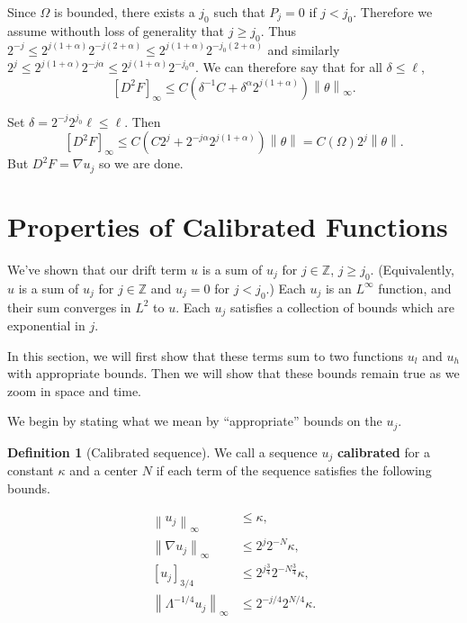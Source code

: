 \documentclass[11pt]{amsart}
\theoremstyle{remark}
\theoremstyle{definition}
\newtheorem{definition}{Definition}
\newcommand{\Z}{\mathbb{Z}}
\newcommand{\norm}[1]{\left\lVert#1\right\rVert}
\newcommand{\paren}[1]{\left( #1 \right)}
\newcommand{\bracket}[1]{\left[ #1 \right]}
\newcommand{\grad}{\nabla}
\newcommand{\n}{^{-1}}
\newcommand{\ulow}{u_l}
\newcommand{\uhigh}{u_h}
\begin{document}
Since $\Omega$ is bounded, there exists a $j_0$ such that $P_j = 0$ if $j < j_0$.  Therefore we assume withouth loss of generality that $j \geq j_0$.  Thus $2^{-j} \leq 2^{j(1+\alpha)} 2^{-j(2+\alpha)} \leq 2^{j(1+\alpha)} 2^{-j_0(2+\alpha)}$ and similarly $2^j \leq 2^{j(1+\alpha)}2^{-j\alpha} \leq 2^{j(1+\alpha)} 2^{-j_0\alpha}$.  We can therefore say that for all $\delta \leq \ell$,
\[ \bracket{D^2 F}_\infty \leq C \paren{\delta\n C + \delta^\alpha 2^{j(1+\alpha)}} \norm{\theta}_\infty. \]

Set $\delta = 2^{-j} 2^{j_0} \ell \leq \ell$.  Then
\[ \bracket{D^2 F}_\infty \leq C \paren{C 2^j + 2^{-j\alpha} 2^{j(1+\alpha)}} \norm{\theta} = C(\Omega) 2^j \norm{\theta}. \]
But $D^2 F = \grad u_j$ so we are done.  



\section{Properties of Calibrated Functions} \label{sec:calibrated functions}
We've shown that our drift term $u$ is a sum of $u_j$ for $j \in \Z$, $j \geq j_0$.  (Equivalently, $u$ is a sum of $u_j$ for $j \in \Z$ and $u_j = 0$ for $j < j_0$.)  Each $u_j$ is an $L^\infty$ function, and their sum converges in $L^2$ to $u$.  Each $u_j$ satisfies a collection of bounds which are exponential in $j$.  

In this section, we will first show that these terms sum to two functions $\ulow$ and $\uhigh$ with appropriate bounds.  Then we will show that these bounds remain true as we zoom in space and time.  

We begin by stating what we mean by ``appropriate'' bounds on the $u_j$.  
\begin{definition}[Calibrated sequence]
We call a sequence $u_j$ \textbf{calibrated} for a constant $\kappa$ and a center $N$ if each term of the sequence satisfies the following bounds.  

\begin{align*}
\norm{u_j}_\infty &\leq \kappa, \\
\norm{\grad u_j}_\infty &\leq 2^{j} 2^{-N} \kappa, \\
\bracket{u_j}_{3/4} &\leq 2^{j \frac{3}{4}} 2^{- N \frac{3}{4}} \kappa, \\
\norm{\Lambda^{-1/4} u_j}_\infty &\leq 2^{-j/4} 2^{N/4} \kappa.  
\end{align*} 

\end{definition}
\end{document}
